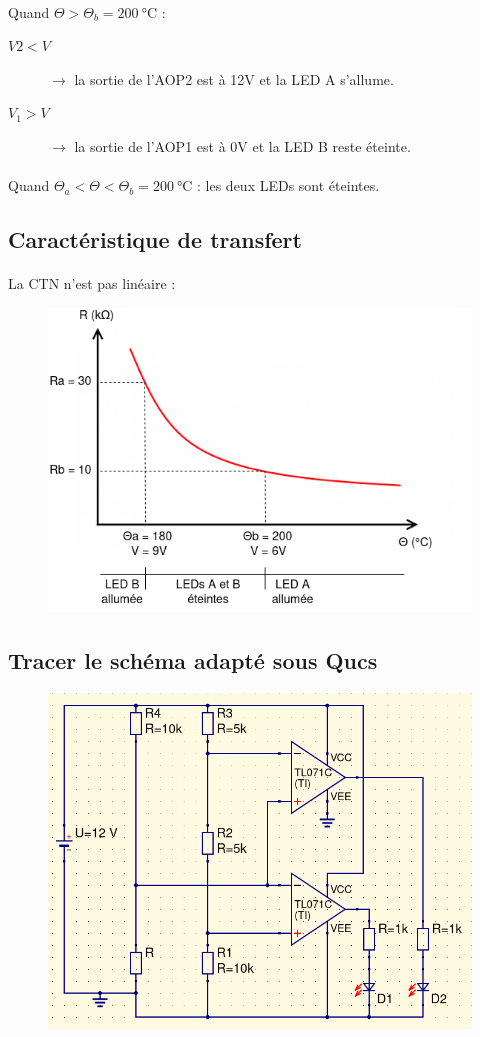 \documentclass{article}
\begin{document}
\paragraph{}
Quand $\Theta > \Theta_b = \SI{200}{\celsius}$ :
\begin{description}
    \item[$V2 < V$] $\rightarrow$ la sortie de l'AOP2 est à 12V et la LED A s'allume.
    \item[$V_1 > V$] $\rightarrow$ la sortie de l'AOP1 est à 0V et la LED B reste éteinte.
\end{description} 

\paragraph{}
Quand $\Theta_a < \Theta < \Theta_b = \SI{200}{\celsius}$ : les deux LEDs sont éteintes.

\newpage
\subsection{Caractéristique de transfert}
\paragraph{}
La CTN n'est pas linéaire :
\begin{figure}[H]
    \centering
    \includegraphics[width=.6\linewidth]{./images/labo4-caract-transfert.png}
\end{figure}

\subsection{Tracer le schéma adapté sous Qucs}
\begin{figure}[H]
    \centering
    \includegraphics[width=.7\linewidth]{./images/labo4-qucs.png}
\end{figure}
\end{document}
